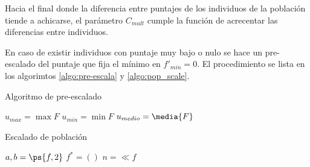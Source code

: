Hacia el final donde la diferencia entre puntajes de los individuos de la
población tiende a achicarse, el parámetro $C_{mult}$ cumple la función de
acrecentar las diferencias entre individuos.

En caso de existir individuos con puntaje muy bajo o nulo se hace un
pre-escalado del puntaje que fija el mínimo en $f'_{min}=0$.
%
El procedimiento se lista en los algorimtos \ref{algo:pre-escala} y
\ref{algo:pop_scale}.


\begin{algorithm} \caption{Algoritmo de pre-escalado}\label{algo:pre-escala}
  \BlankLine

  $u_{max} = \max{F}$\;
  $u_{min} = \min{F}$\;
  $u_{medio} = \media{F}$\;
\end{algorithm}


\begin{algorithm}\caption{Escalado de población}\label{algo:pop_scale}
  \BlankLine

  $a, b = \ps{f, 2}$\;
  $f^{*} = ()$ \;
  $n = \ll{f}$\;
  \;
\end{algorithm}

